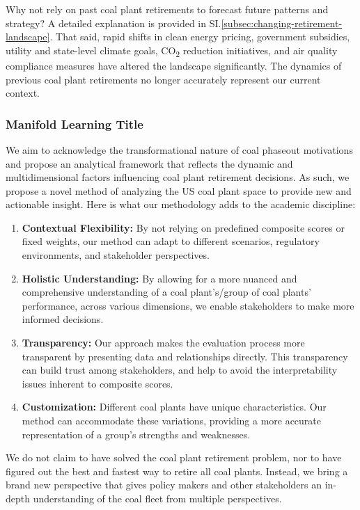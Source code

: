 Why not rely on past coal plant retirements to forecast future patterns and strategy? A detailed explanation is provided in SI.\ref{subsec:changing-retirement-landscape}. 
That said, rapid shifts in clean energy pricing, government subsidies, utility and state-level climate goals, CO\textsubscript{2} reduction initiatives, and air quality 
compliance measures have altered the landscape significantly. The dynamics of previous coal plant retirements no longer accurately represent our current context.


\subsubsection{Manifold Learning Title}
We aim to acknowledge the transformational nature of coal phaseout motivations and propose an analytical framework that reflects the 
dynamic and multidimensional factors influencing coal plant retirement decisions. As such, we propose a novel method of analyzing the 
US coal plant space to provide new and actionable insight. Here is what our methodology adds to the academic discipline:

\begin{enumerate}
    \item \textbf{Contextual Flexibility:} By not relying on predefined composite scores or fixed weights, our method can adapt to different scenarios, regulatory environments, and stakeholder perspectives.
    \item \textbf{Holistic Understanding:} By allowing for a more nuanced and comprehensive understanding of a coal plant's/group of coal plants' performance, across various dimensions, we enable stakeholders to make more informed decisions.
    \item \textbf{Transparency:} Our approach makes the evaluation process more transparent by presenting data and relationships directly. This transparency can build trust among stakeholders, and help to avoid the interpretability issues inherent to composite scores.
    \item \textbf{Customization:} Different coal plants have unique characteristics. Our method can accommodate these variations, providing a more accurate representation of a group's strengths and weaknesses.
\end{enumerate}

We do not claim to have solved the coal plant retirement problem, nor to have figured out the best and fastest way to retire all coal plants. 
Instead, we bring a brand new perspective that gives policy makers and other stakeholders an in-depth understanding of the coal fleet from 
multiple perspectives.



